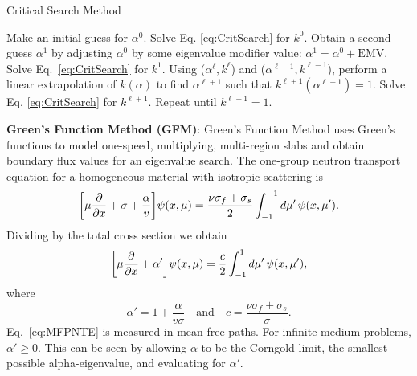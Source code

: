 \begin{algorithm}[H]
				\caption{Critical Search Method \cite{hill_efficient_1983}}
				\begin{algorithmic}[1]
					\STATE Make an initial guess for $\alpha^{0}$.
					\STATE Solve Eq. \ref{eq:CritSearch} for $k^{0}$.
					\STATE Obtain a second guess $\alpha^{1}$ by adjusting $\alpha^{0}$ by some eigenvalue modifier value: $\alpha^{1} = \alpha^{0} + \text{EMV}$.
					\STATE Solve Eq.~\ref{eq:CritSearch} for $k^{1}$.
					\STATE Using ($\alpha^{\ell}, k^{\ell}$) and ($\alpha^{\ell-1},k^{\ell-1}$), perform a linear extrapolation of $k(\alpha)$ to find $\alpha^{\ell+1}$ such that $k^{\ell+1}(\alpha^{\ell+1}) = 1$.
					\STATE Solve Eq. \ref{eq:CritSearch} for $k^{\ell+1}$.
					\STATE Repeat until $k^{\ell+1} = 1$.
				\end{algorithmic}
				\label{algo:critsearch}
\end{algorithm}

\textbf{Green's Function Method (GFM)}: Green's Function Method \cite{kornreich_timeeigenvalue_2005} uses Green's functions to model one-speed, multiplying, multi-region slabs and obtain boundary flux values for an eigenvalue search. The one-group neutron transport equation for a homogeneous material with isotropic scattering is
\begin{equation}
	\bigg [ \mu \frac{\partial}{\partial x} + \sigma + \frac{\alpha}{v} \bigg ] \psi(x,\mu) = \frac{\nu \sigma_{f} + \sigma_{s}}{2} \int_{-1}^{-1} \mathop{}\!d \mu' \, \psi(x,\mu').
	\label{eq:GFMNTE}
\end{equation}
Dividing by the total cross section we obtain
\begin{equation}
	\bigg [ \mu \frac{\partial}{\partial x} + \alpha' \bigg ] \psi(x,\mu) = \frac{c}{2} \int_{-1}^{1} \mathop{}\!d \mu' \, \psi(x,\mu'),
	\label{eq:MFPNTE}
\end{equation}
where
\begin{equation}
	\alpha' = 1 + \frac{\alpha}{v \sigma} \quad \text{and} \quad c = \frac{\nu \sigma_{f} + \sigma_{s}}{\sigma}.
\end{equation}
Eq.~\ref{eq:MFPNTE} is measured in mean free paths. For infinite medium problems, $\alpha' \geq 0$. This can be seen by allowing $\alpha$ to be the Corngold limit, the smallest possible alpha-eigenvalue, and evaluating for $\alpha'$.


